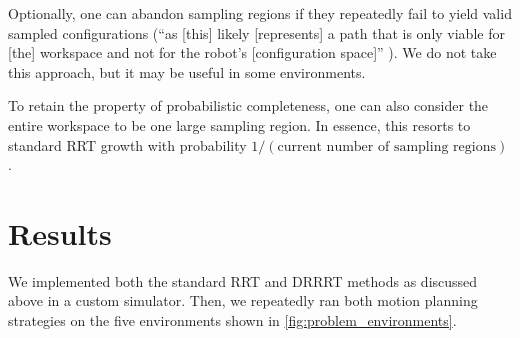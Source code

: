\documentclass[conference]{IEEEtran}
\begin{document}
Optionally, one can abandon sampling regions if they repeatedly fail to yield valid sampled configurations (``as [this] likely [represents] a path that is only viable for [the] workspace and not for the robot's [configuration space]'' \cite{DRRRT}). We do not take this approach, but it may be useful in some environments.

To retain the property of probabilistic completeness, one can also consider the entire workspace to be one large sampling region. In essence, this resorts to standard RRT growth with probability $1 / (\text{current number of sampling regions})$.

\section{Results}

We implemented both the standard RRT and DRRRT methods as discussed above in a custom simulator. Then, we repeatedly ran both motion planning strategies on the five environments shown in \autoref{fig:problem_environments}.
\end{document}
